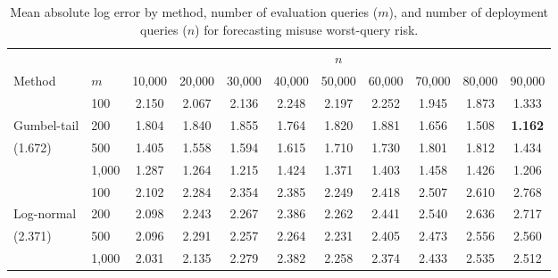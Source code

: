 \begin{table}[h]
\centering
\begin{tabular}{llccccccccc}
\toprule
& & \multicolumn{9}{c}{$n$} \\
Method & $m$ & 10,000 & 20,000 & 30,000 & 40,000 & 50,000 & 60,000 & 70,000 & 80,000 & 90,000 \\
\midrule
 & 100 & 2.150 & 2.067 & 2.136 & 2.248 & 2.197 & 2.252 & 1.945 & 1.873 & 1.333 \\
Gumbel-tail & 200 & 1.804 & 1.840 & 1.855 & 1.764 & 1.820 & 1.881 & 1.656 & 1.508 & \textbf{1.162} \\
(1.672) & 500 & 1.405 & 1.558 & 1.594 & 1.615 & 1.710 & 1.730 & 1.801 & 1.812 & 1.434 \\
 & 1,000 & 1.287 & 1.264 & 1.215 & 1.424 & 1.371 & 1.403 & 1.458 & 1.426 & 1.206 \\
\midrule
 & 100 & 2.102 & 2.284 & 2.354 & 2.385 & 2.249 & 2.418 & 2.507 & 2.610 & 2.768 \\
Log-normal & 200 & 2.098 & 2.243 & 2.267 & 2.386 & 2.262 & 2.441 & 2.540 & 2.636 & 2.717 \\
(2.371) & 500 & 2.096 & 2.291 & 2.257 & 2.264 & 2.231 & 2.405 & 2.473 & 2.556 & 2.560 \\
 & 1,000 & 2.031 & 2.135 & 2.279 & 2.382 & 2.258 & 2.374 & 2.433 & 2.535 & 2.512 \\
\bottomrule
\end{tabular}
\caption{Mean absolute log error by method, number of evaluation queries ($m$), and number of deployment queries ($n$) for forecasting misuse worst-query risk.}
\label{tab:worst-query-oom-error-combined}
\end{table}